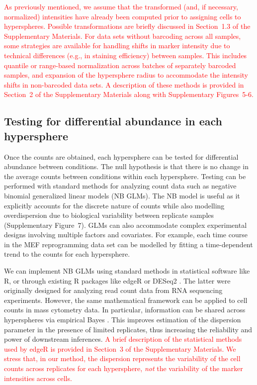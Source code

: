 \documentclass{article}
\newcommand\revised[1]{\textcolor{red}{#1}}
\newcommand{\supptransform}{1.3}
\newcommand{\suppintnorm}{2}
\newcommand{\suppedgeR}{3}
\newcommand{\suppfigintnorm}{5-6}
\newcommand{\suppfignbdisp}{7}
\begin{document}
\revised{As previously mentioned, we assume that the transformed (and, if necessary, normalized) intensities have already been computed prior to assigning cells to hyperspheres.
Possible transformations are briefly discussed in Section~\supptransform{} of the Supplementary Materials.
For data sets without barcoding across all samples, some strategies are available for handling shifts in marker intensity due to technical differences (e.g., in staining efficiency) between samples.
This includes quantile or range-based normalization across batches of separately barcoded samples, and expansion of the hypersphere radius to accommodate the intensity shifts in non-barcoded data sets. 
A description of these methods is provided in Section~\suppintnorm{} of the Supplementary Materials along with Supplementary Figures~\suppfigintnorm{}.}    

\subsection{Testing for differential abundance in each hypersphere}
Once the counts are obtained, each hypersphere can be tested for differential abundance between conditions.
The null hypothesis is that there is no change in the average counts between conditions within each hypersphere.
Testing can be performed with standard methods for analyzing count data such as negative binomial generalized linear models (NB GLMs).
The NB model is useful as it explicitly accounts for the discrete nature of counts while also modelling overdispersion due to biological variability between replicate samples (Supplementary Figure~\suppfignbdisp{}).
GLMs can also accommodate complex experimental designs involving multiple factors and covariates.
For example, each time course in the MEF reprogramming data set can be modelled by fitting a time-dependent trend to the counts for each hypersphere.

We can implement NB GLMs using standard methods in statistical software like R, or through existing R packages like edgeR \cite{robinson2010edgeR} or DESeq2 \cite{love2014moderated}.
The latter were originally designed for analyzing read count data from RNA sequencing experiments.
However, the same mathematical framework can be applied to cell counts in mass cytometry data.
In particular, information can be shared across hyperspheres via empirical Bayes \cite{mccarthy2012differential, lund2012detecting}.
This improves estimation of the dispersion parameter in the presence of limited replicates, thus increasing the reliability and power of downstream inferences.
\revised{A brief description of the statistical methods used by edgeR is provided in Section~\suppedgeR{} of the Supplementary Materials.
    We stress that, in our method, the dispersion represents the variability of the cell counts across replicates for each hypersphere, \textit{not} the variability of the marker intensities across cells.}
\end{document}
